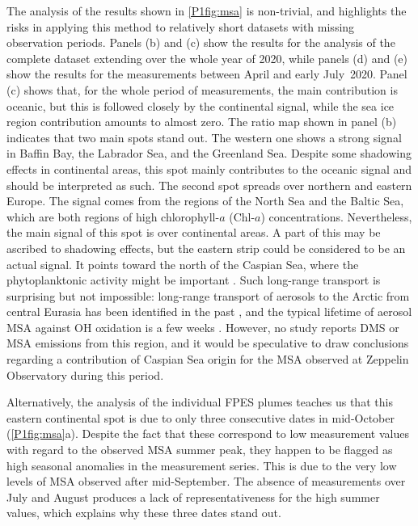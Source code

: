     The analysis of the results shown in \cref{P1fig:msa} is non-trivial, and highlights the risks in applying this method to relatively short datasets with missing observation periods.
    Panels (b) and (c) show the results for the analysis of the complete dataset extending over the whole year of 2020, while panels (d) and (e) show the results for the measurements between April and early July~2020.
    Panel (c) shows that, for the whole period of measurements, the main contribution is oceanic, but this is followed closely by the continental signal, while the sea ice region contribution amounts to almost zero.
    The ratio map shown in panel (b) indicates that two main spots stand out. The western one shows a strong signal in Baffin Bay, the Labrador Sea, and the Greenland Sea.
    Despite some shadowing effects in continental areas, this spot mainly contributes to the oceanic signal and should be interpreted as such.
    The second spot spreads over northern and eastern Europe. The signal comes from the regions of the North Sea and the Baltic Sea, which are both regions of high chlorophyll-$a$ (Chl-$a$) concentrations.
    Nevertheless, the main signal of this spot is over continental areas.
    A part of this may be ascribed to shadowing effects, but the eastern strip could be considered to be an actual signal.
    It points toward the north of the Caspian Sea, where the phytoplanktonic activity might be important \citep{eker_phytoplankton_2005}.
    Such long-range transport is surprising but not impossible: long-range transport of aerosols to the Arctic from central Eurasia has been identified in the past \citep{marelle_transport_2015}, and the typical lifetime of aerosol MSA against OH oxidation is a few weeks \citep{mungall_heterogeneous_2018}.
    However, no study reports DMS or MSA emissions from this region, and it would be speculative to draw conclusions regarding a contribution of Caspian Sea origin for the MSA observed at Zeppelin Observatory during this period.

    Alternatively, the analysis of the individual FPES plumes teaches us that this eastern continental spot is due to only three consecutive dates in mid-October (\cref{P1fig:msa}a).
    Despite the fact that these correspond to low measurement values with regard to the observed MSA summer peak, they happen to be flagged as high seasonal anomalies in the measurement series.
    This is due to the very low levels of MSA observed after mid-September.
    The absence of measurements over July and August produces a lack of representativeness for the high summer values, which explains why these three dates stand out.

